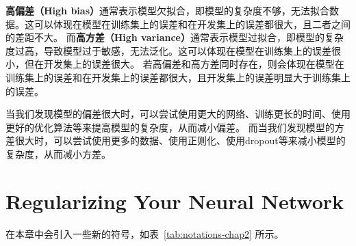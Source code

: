 \textbf{高偏差（High bias）}通常表示模型欠拟合，即模型的复杂度不够，无法拟合数据。这可以体现在模型在训练集上的误差和在开发集上的误差都很大，且二者之间的差距不大。
而\textbf{高方差（High variance）}通常表示模型过拟合，即模型的复杂度过高，导致模型过于敏感，无法泛化。这可以体现在模型在训练集上的误差很小，但在开发集上的误差很大。
若高偏差和高方差同时存在，则会体现在模型在训练集上的误差和在开发集上的误差都很大，且开发集上的误差明显大于训练集上的误差。

当我们发现模型的偏差很大时，可以尝试使用更大的网络、训练更长的时间、使用更好的优化算法等来提高模型的复杂度，从而减小偏差。
而当我们发现模型的方差很大时，可以尝试使用更多的数据、使用正则化、使用dropout等来减小模型的复杂度，从而减小方差。

\section{Regularizing Your Neural Network}

在本章中会引入一些新的符号，如表~\ref{tab:notations-chap2} 所示。

